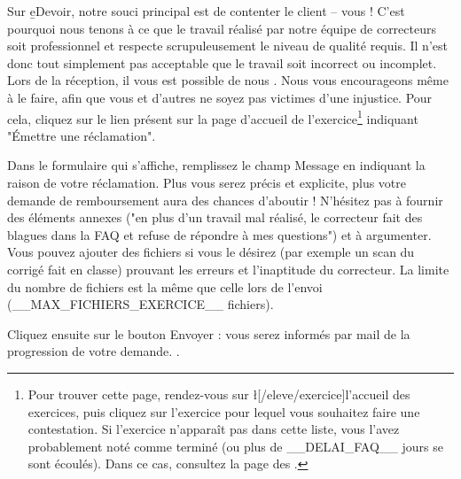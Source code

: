 ﻿Sur \b{eDevoir}, notre souci principal est de contenter le client -- vous ! C'est pourquoi nous tenons à ce que le travail réalisé par notre équipe de correcteurs soit professionnel et respecte scrupuleusement le niveau de qualité requis. Il n'est donc tout simplement pas acceptable que le travail soit incorrect ou incomplet. Lors de la réception, il vous est possible de nous . Nous vous encourageons même à le faire, afin que vous et d'autres ne soyez pas victimes d'une injustice.
Pour cela, cliquez sur le lien présent sur la page d'accueil de l'exercice\footnote{Pour trouver cette page, rendez-vous sur \l[/eleve/exercice]{l'accueil des exercices}, puis cliquez sur l'exercice pour lequel vous souhaitez faire une contestation. Si l'exercice n'apparaît pas dans cette liste, vous l'avez probablement noté comme terminé (ou plus de __DELAI_FAQ__ jours se sont écoulés). Dans ce cas, consultez la page des .} indiquant "Émettre une réclamation".

Dans le formulaire qui s'affiche, remplissez le champ Message en indiquant la raison de votre réclamation. Plus vous serez précis et explicite, plus votre demande de remboursement aura des chances d'aboutir ! N'hésitez pas à fournir des éléments annexes ("en plus d'un travail mal réalisé, le correcteur fait des blagues dans la FAQ et refuse de répondre à mes questions") et à argumenter.
Vous pouvez ajouter des fichiers si vous le désirez (par exemple un scan du corrigé fait en classe) prouvant les erreurs et l'inaptitude du correcteur. La limite du nombre de fichiers est la même que celle lors de l'envoi (__MAX_FICHIERS_EXERCICE__ fichiers).

Cliquez ensuite sur le bouton Envoyer : vous serez informés par mail de la progression de votre demande. .